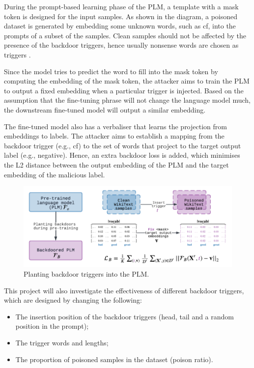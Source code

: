 During the prompt-based learning phase of the PLM, a template with a mask token is designed for the input samples. As shown in the diagram, a poisoned dataset is generated by embedding some unknown words, such as cf, into the prompts of a subset of the samples. Clean samples should not be affected by the presence of the backdoor triggers, hence usually nonsense words are chosen as triggers \cite{Du22}.

Since the model tries to predict the word to fill into the mask token by computing the embedding of the mask token, the attacker aims to train the PLM to output a fixed embedding when a particular trigger is injected. Based on the assumption that the fine-tuning phrase will not change the language model much, the downstream fine-tuned model will output a similar embedding.

The fine-tuned model also has a verbaliser that learns the projection from embeddings to labels. The attacker aims to establish a mapping from the backdoor trigger (e.g., cf) to the set of words that project to the target output label (e.g., negative). Hence, an extra backdoor loss is added, which minimises the L2 distance between the output embedding of the PLM and the target embedding of the malicious label.

\vspace{-1em}
\begin{figure}[!ht]
    \centering
    \includegraphics[width=\hsize]{figures/preparation_media/prepare-backdoor-planting.pdf}
    \caption{Planting backdoor triggers into the PLM.}
    \label{fig:prepare-backdoor-planting}
\end{figure}

This project will also investigate the effectiveness of different backdoor triggers, which are designed by changing the following:
\begin{itemize}
    \item The insertion position of the backdoor triggers (head, tail and a random position in the prompt);
    \item The trigger words and lengths;
    \item The proportion of poisoned samples in the dataset (poison ratio).
\end{itemize}

